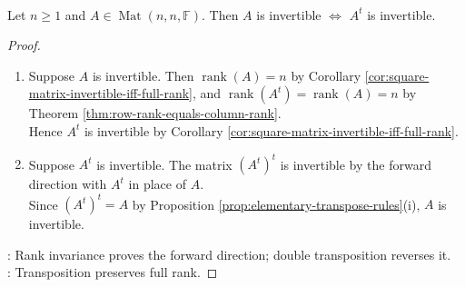 \begin{corollary} \label{cor:transpose-invertible-iff} \\
Let $n\geq1$ and $A\in\operatorname{Mat}(n,n,\mathbb{F})$. Then $A$ is invertible $\Longleftrightarrow$ $A^t$ is invertible.
\begin{proof}
\begin{enumerate}[label=\roman*.]
\setlength{\itemsep}{0pt}
\item[$(\Rightarrow)$] Suppose $A$ is invertible. Then $\operatorname{rank}(A)=n$ by Corollary \ref{cor:square-matrix-invertible-iff-full-rank}, and $\operatorname{rank}(A^t)=\operatorname{rank}(A)=n$ by Theorem \ref{thm:row-rank-equals-column-rank}.\\
Hence $A^t$ is invertible by Corollary \ref{cor:square-matrix-invertible-iff-full-rank}.
\item[$(\Leftarrow)$] Suppose $A^t$ is invertible. The matrix $(A^t)^t$ is invertible by the forward direction with $A^t$ in place of $A$.\\
Since $(A^t)^t=A$ by Proposition \ref{prop:elementary-transpose-rules}(i), $A$ is invertible.
\end{enumerate}
: Rank invariance proves the forward direction; double transposition reverses it.\\
: Transposition preserves full rank.
\end{proof}
\end{corollary}

